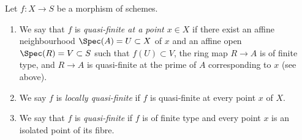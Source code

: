 \begin{definition}
\label{definition-quasi-finite}
\begin{reference}
\cite[II Definition 6.2.3]{EGA}
\end{reference}
Let $f : X \to S$ be a morphism of schemes.
\begin{enumerate}
\item We say that $f$ is {\it quasi-finite at a point $x \in X$}
if there exist an affine neighbourhood $\Spec(A) = U \subset X$
of $x$ and an affine open $\Spec(R) = V \subset S$ such that
$f(U) \subset V$, the ring map $R \to A$ is of finite type,
and $R \to A$ is quasi-finite at the prime of $A$ corresponding to $x$
(see above).
\item We say $f$ is {\it locally quasi-finite} if $f$ is
quasi-finite at every point $x$ of $X$.
\item We say that $f$ is {\it quasi-finite} if $f$ is of finite type
and every point $x$ is an isolated point of its fibre.
\end{enumerate}
\end{definition}